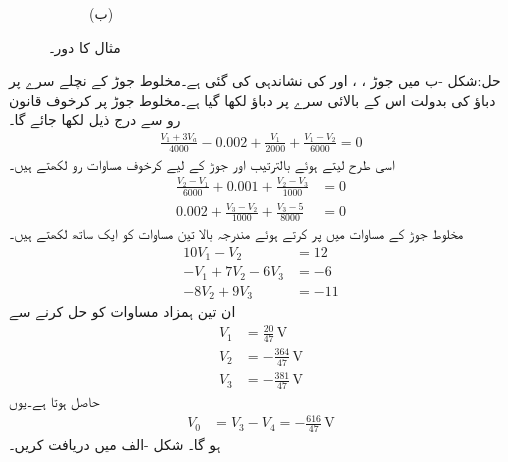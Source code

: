\begin{figure}
\begin{subfigure}{1\textwidth}
%
\caption*{(ب)}
\end{subfigure}
\caption{مثال  کا دور۔}
\label{شکل_جوڑ_تابع_منبع_مخلوط_جوڑ_الف}
\end{figure}%

حل:شکل -ب میں جوڑ ، ،   اور  کی نشاندہی کی گئی ہے۔مخلوط جوڑ کے نچلے سرے پر  دباؤ کی بدولت اس کے بالائی سرے پر  دباؤ لکھا گیا ہے۔مخلوط جوڑ پر کرخوف قانون رو سے درج ذیل لکھا جائے گا۔
\begin{align*}
\frac{V_1+3V_a}{4000}-0.002+\frac{V_1}{2000}+\frac{V_1-V_2}{6000}=0
\end{align*}
اسی طرح  لیتے ہوئے  بالترتیب  اور   جوڑ کے لیے کرخوف مساوات رو لکھتے ہیں۔
\begin{align*}
\frac{V_2-V_1}{6000}+0.001+\frac{V_2-V_3}{1000}&=0\\
0.002+\frac{V_3-V_2}{1000}+\frac{V_3-5}{8000}&=0
\end{align*}
مخلوط جوڑ کے مساوات میں  پر کرتے ہوئے مندرجہ بالا تین مساوات کو ایک ساتھ لکھتے ہیں۔
\begin{align*}
10 V_1-V_2&=12\\
-V_1+7V_2-6V_3&=-6\\
-8V_2+9V_3&=-11
\end{align*}
ان تین ہمزاد مساوات کو حل کرنے سے
\begin{align*}
V_1&=\frac{20}{47} \, \si{\volt}\\
V_2&=-\frac{364}{47} \, \si{\volt}\\
V_3&=-\frac{381}{47} \, \si{\volt}
\end{align*}
حاصل ہوتا ہے۔یوں
\begin{align*}
V_0&=V_3-V_4=-\frac{616}{47} \, \si{\volt}
\end{align*}
ہو گا۔
شکل -الف میں  دریافت کریں۔

